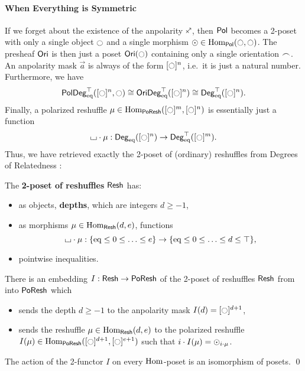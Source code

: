 \documentclass[a4paper]{memoir}
\begin{document}
\paragraph{When Everything is Symmetric}
If we forget about the existence of the anpolarity $\ypolar$, then ${\mathsf{Pol}}$ becomes a 2-poset with only a single object $\npolar$ and a single morphism $\nonpol \in \Hom_\polcat(\npolar, \npolar)$.
The presheaf ${\mathsf{Ori}}$ is then just a poset $\oripsh(\npolar)$ containing only a single orientation ${\frown}$.
An anpolarity mask $\vec a$ is always of the form $[\npolar]^n$, i.e.\ it is just a natural number.
Furthermore, we have
\[
	\poldegeqtop([\npolar]^n, \npolar) \cong \oridegeqtop([\npolar]^n) \cong \Degeqtop([\npolar]^n).
\]
Finally, a polarized reshuffle $\mu \in \Hom_\poreshcat([\npolar]^m, [\npolar]^n)$ is essentially just a function
\[
	\loch \cdot \mu : \Degeq([\npolar]^n) \to \Degeqtop([\npolar]^m).
\]
Thus, we have retrieved exactly the 2-poset of (ordinary) reshuffles from Degrees of Relatedness \cite{reldtt,reldtt-techreport}:
\begin{definition}
	The \textbf{2-poset of reshuffles} $\mathsf{Resh}$ has:
	\begin{itemize}
		\item as objects, \textbf{depths}, which are integers $d \geq -1$,
		\item as morphisms $\mu \in {\mathrm{Hom}}_{\mathsf{Resh}}(d, e)$, functions
		\[
			{\llcorner\hspace{-.4ex}\lrcorner} \cdot \mu : \mathopen{}\left\{ {\mathrm{eq}} \leq 0 \leq \ldots \leq e \right\}\mathclose{} \to \mathopen{}\left\{ {\mathrm{eq}} \leq 0 \leq \ldots \leq d \leq \top \right\}\mathclose{},
		\]
		\item pointwise inequalities.
	\end{itemize}
\end{definition}
\begin{theorem} \label{thm:reshcat-poreshcat}
	There is an embedding $I : \mathsf{Resh} \to \mathsf{PoResh}$ of the 2-poset of reshuffles $\mathsf{Resh}$ from \cite[def.\ 6.2.7]{reldtt-techreport} into $\mathsf{PoResh}$ which
	\begin{itemize}
		\item sends the depth $d \geq -1$ to the anpolarity mask $I(d) = [\npolar]^{d+1}$,
		\item sends the reshuffle $\mu \in {\mathrm{Hom}}_{\mathsf{Resh}}(d, e)$ to the polarized reshuffle $I(\mu) \in \Hom_\poreshcat([\npolar]^{d+1}, [\npolar]^{e+1})$
		such that $i \cdot I(\mu) = {{\odot}}_{i \cdot \mu}$.
	\end{itemize}
	The action of the 2-functor $I$ on every ${\mathrm{Hom}}$-poset is an isomorphism of posets. \qed
\end{theorem}
\end{document}
